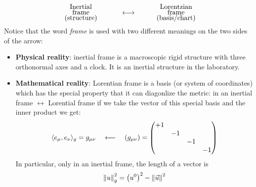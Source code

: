 \documentclass[../main.tex]{subfiles}
\begin{document}
\[
\text{\parbox{4 cm}{\centering Inertial \\[-4pt] frame \\[-4pt] (structure)}}\longleftrightarrow\text{\parbox{4 cm}{\centering Lorentzian \\[-4pt] frame  \\[-4pt] (basis/chart)}}
\]
Notice that the word \textit{frame} is used with two different meanings on the two sides of the arrow:
\begin{itemize}
    \item \textbf{Physical reality}: inertial frame is a macroscopic rigid structure with three orthonormal axes and a clock. It is an inertial structure in the laboratory.
    \item \textbf{Mathematical reality}: Lorentian frame is a basis (or system of coordinates) which has the special property that it can diagonlize the metric: in an inertial frame $\leftrightarrow$ Lorential frame if we take the vector of this special basis and the inner product we get:
    \[
    \langle e_\mu, e_\nu \rangle_g = g_{\mu\nu} \quad \longleftarrow \quad\pqty{g_{\mu\nu}}=\mqty(\dmat{+1,-1,-1,-1})
    \]
    In particular, only in an inertial frame, the length of a vector is
    \[
    \norm{u}_g^2=\pqty{u^0}^2-\norm{\vec{u}}^2
    \]
\end{itemize}
\end{document}
